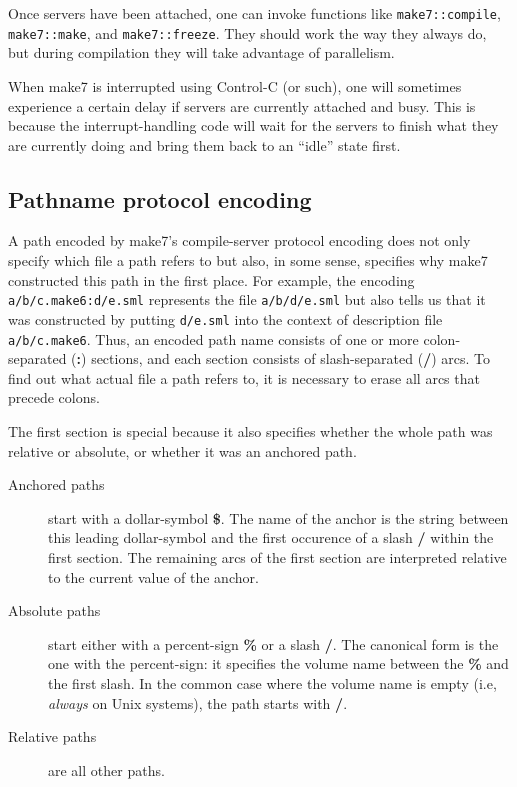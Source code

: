 Once servers have been attached, one can invoke functions like
{\tt make7::compile}, {\tt make7::make}, and {\tt make7::freeze}.
They should work the way they always do, but during compilation they
will take advantage of parallelism.

When make7 is interrupted using Control-C (or such), one will sometimes
experience a certain delay if servers are currently attached and busy.
This is because the interrupt-handling code will wait for the servers
to finish what they are currently doing and bring them back to an
``idle'' state first.

\subsection{Pathname protocol encoding}
\label{sec:pathencode}

A path encoded by make7's compile-server protocol encoding does not only
specify which file a path refers to but also, in some sense, specifies
why make7 constructed this path in the first place.  For example, the
encoding {\tt a/b/c.make6:d/e.sml} represents the file {\tt a/b/d/e.sml}
but also tells us that it was constructed by putting {\tt d/e.sml}
into the context of description file {\tt a/b/c.make6}.  Thus, an encoded
path name consists of one or more colon-separated ({\bf :}) sections,
and each section consists of slash-separated ({\bf /}) arcs.  To find
out what actual file a path refers to, it is necessary to erase all
arcs that precede colons.

The first section is special because it also specifies whether the
whole path was relative or absolute, or whether it was an anchored
path.

\begin{description}
\item[Anchored paths] start with a dollar-symbol {\bf \$}.  The name
of the anchor is the string between this leading dollar-symbol and the
first occurence of a slash {\bf /} within the first section.  The
remaining arcs of the first section are interpreted relative to the
current value of the anchor.
\item[Absolute paths] start either with a percent-sign {\bf \%} or a
slash {\bf /}.  The canonical form is the one with the percent-sign:
it specifies the volume name between the {\bf \%} and the first slash.
In the common case where the volume name is empty (i.e, {\em always} on
Unix systems), the path starts with {\bf /}.
\item[Relative paths] are all other paths.
\end{description}

